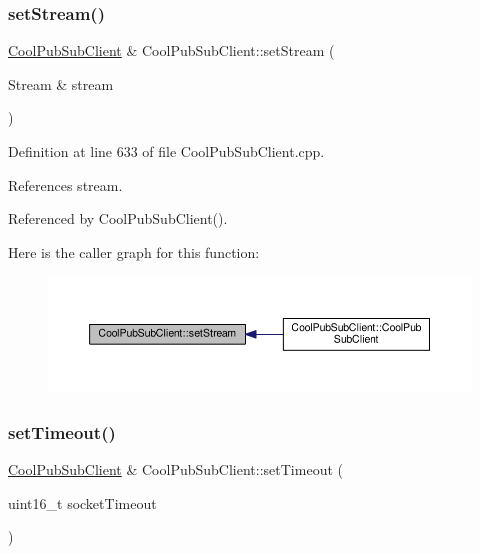 \subsubsection{\texorpdfstring{set\+Stream()}{setStream()}}
{\footnotesize\ttfamily \hyperlink{class_cool_pub_sub_client}{Cool\+Pub\+Sub\+Client} \& Cool\+Pub\+Sub\+Client\+::set\+Stream (\begin{DoxyParamCaption}\item[{Stream \&}]{stream }\end{DoxyParamCaption})}



Definition at line 633 of file Cool\+Pub\+Sub\+Client.\+cpp.



References stream.



Referenced by Cool\+Pub\+Sub\+Client().

Here is the caller graph for this function\+:\nopagebreak
\begin{figure}[H]
\begin{center}
\leavevmode
\includegraphics[width=350pt]{d8/d4b/class_cool_pub_sub_client_ae97e40823ea689ff9e36d5bdd71bb933_icgraph}
\end{center}
\end{figure}
\mbox{\label{class_cool_pub_sub_client_a2276c7e52531b597b4342fadf3722f43}} 
\subsubsection{\texorpdfstring{set\+Timeout()}{setTimeout()}}
{\footnotesize\ttfamily \hyperlink{class_cool_pub_sub_client}{Cool\+Pub\+Sub\+Client} \& Cool\+Pub\+Sub\+Client\+::set\+Timeout (\begin{DoxyParamCaption}\item[{uint16\+\_\+t}]{socket\+Timeout }\end{DoxyParamCaption})}



